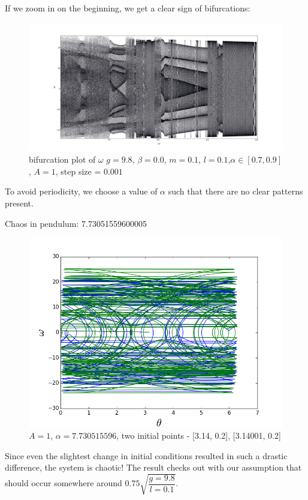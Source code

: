 \documentclass[12pt]{article}\pagestyle{myheadings}
\theoremstyle{plain}
\begin{document}
If we zoom in on the beginning, we get a clear sign of bifurcations:

 \begin{figure}[H]
\centering
\includegraphics[scale=.20]{choosing_alpha}
\caption{bifurcation plot of $\omega$ $g = 9.8$, $\beta = 0.0$, $m = 0.1$, $l = 0.1$,$\alpha \in [0.7,0.9]$, $A = 1$, step size = $0.001$}
\label{fig:my_label}
\end{figure}

To avoid periodicity, we choose a value of $\alpha$ such that there are no clear patterns present. 

Chaos in pendulum:
7.73051559600005
 
 \begin{figure}[H]
\centering
\includegraphics[scale=.5]{6_chaos_actually}
\caption{$A = 1$, $\alpha = 7.730515596$, two initial points - [3.14, 0.2], [3.14001, 0.2]}
\label{fig:my_label}
\end{figure}

Since even the slightest change in initial conditions resulted in such a drastic difference, the system is chaotic!
The result checks out with our assumption that should occur somewhere around $ 0.75 \sqrt{\dfrac{g=9.8}{l=0.1} }$.
\end{document}
